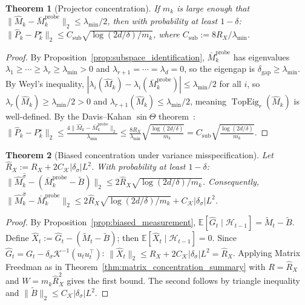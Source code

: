 \documentclass[11pt]{article}
\newcommand{\E}{\mathbb{E}}
\newcommand{\cH}{\mathcal{H}}
\DeclareMathOperator{\TopEig}{TopEig}
\newtheorem{theorem}{Theorem}
\begin{document}
\begin{theorem}[Projector concentration]
\label{thm:projector_concentration_summary}
If $m_k$ is large enough that
$\|\widehat{M}_k-\bar{M}_k^{\mathrm{probe}}\|_2\le\lambda_{\min}/2$, then with
probability at least $1-\delta$:
$\|\widehat{P}_k-P_k^\star\|_2
\le C_{\mathrm{sub}}\sqrt{\log(2d/\delta)/m_k}$,
where $C_{\mathrm{sub}}:=8R_X/\lambda_{\min}$.
\end{theorem}

\begin{proof}
By Proposition~\ref{prop:subspace_identification}, $\bar{M}_k^{\mathrm{probe}}$
has eigenvalues $\lambda_1\ge\cdots\ge\lambda_r\ge\lambda_{\min}>0$ and
$\lambda_{r+1}=\cdots=\lambda_d=0$, so the eigengap is
$\delta_{\mathrm{gap}}\ge\lambda_{\min}$.
By Weyl's inequality,
$|\lambda_i(\widehat{M}_k)-\lambda_i(\bar{M}_k^{\mathrm{probe}})|\le\lambda_{\min}/2$
for all $i$, so $\lambda_r(\widehat{M}_k)\ge\lambda_{\min}/2>0$ and
$\lambda_{r+1}(\widehat{M}_k)\le\lambda_{\min}/2$, meaning $\TopEig_r(\widehat{M}_k)$
is well-defined.
By the Davis--Kahan $\sin\Theta$ theorem~\citep{yu2015useful}:
$\|\widehat{P}_k-P_k^\star\|_2
\le\frac{4\|\widehat{M}_k-\bar{M}_k^{\mathrm{probe}}\|_2}{\lambda_{\min}}
\le\frac{8R_X}{\lambda_{\min}}\sqrt{\frac{\log(2d/\delta)}{m_k}}
= C_{\mathrm{sub}}\sqrt{\frac{\log(2d/\delta)}{m_k}}$.
\end{proof}

\begin{theorem}[Biased concentration under variance misspecification]
\label{thm:biased_concentration}
Let $\hat{R}_X := R_X + 2C_{\mathcal{K}}|\delta_\sigma|L^2$.
With probability at least $1-\delta$:
$\|\widehat{M}_k^{\hat\sigma}-(\bar{M}_k^{\mathrm{probe}}-\widetilde{B})\|_2
\le 2\hat{R}_X\sqrt{\log(2d/\delta)/m_k}$.
Consequently,
$\|\widehat{M}_k^{\hat\sigma}-\bar{M}_k^{\mathrm{probe}}\|_2
\le 2\hat{R}_X\sqrt{\log(2d/\delta)/m_k} + C_{\mathcal{K}}|\delta_\sigma|L^2$.
\end{theorem}

\begin{proof}
By Proposition~\ref{prop:biased_measurement},
$\E[\hat{G}_t\mid\cH_{t-1}]=\widetilde{M}_t-\widetilde{B}$.
Define $\hat{X}_t := \hat{G}_t-(\widetilde{M}_t-\widetilde{B})$; then
$\E[\hat{X}_t\mid\cH_{t-1}]=0$.
Since $\hat{G}_t = G_t-\delta_\sigma\mathcal{K}^{-1}(u_tu_t^\top)$:
$\|\hat{X}_t\|_2\le R_X+2C_{\mathcal{K}}|\delta_\sigma|L^2=\hat{R}_X$.
Applying Matrix Freedman as in Theorem~\ref{thm:matrix_concentration_summary}
with $R=\hat{R}_X$ and $W=m_k\hat{R}_X^2$ gives the first bound.
The second follows by triangle inequality and
$\|\widetilde{B}\|_2\le C_{\mathcal{K}}|\delta_\sigma|L^2$.
\end{proof}
\end{document}

